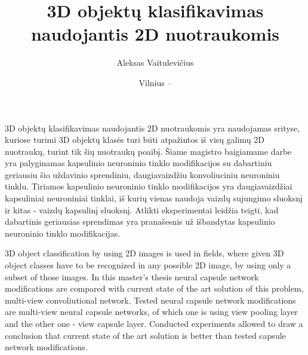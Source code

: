 \documentclass{VUMIFInfMagistrinis}
\title{3D objektų klasifikavimas naudojantis 2D nuotraukomis}
\author{Aleksas Vaitulevičius}
\date{Vilnius – \the\year}
\begin{document}
\maketitle

3D objektų klasifikavimas naudojantis 2D nuotraukomis yra naudojamas srityse, kuriose turimi 3D objektų klasės turi būti atpažintos iš visų galimų 2D nuotraukų, turint tik šių nuotraukų poaibį. Šiame magistro baigiamame darbe yra palyginamas kapsulinio neuroninio tinklo modifikacijos su dabartiniu geriausiu šio uždavinio sprendiniu, daugiavaizdžiu konvoliuciniu neuroniniu tinklu. Tiriamos kapsulinio neuroninio tinklo modifikacijos yra daugiavaizdžiai kapsuliniai neuroniniai tinklai, iš kurių vienas naudoja vaizdų sujungimo sluoksnį ir kitas - vaizdų kapsulinį sluoksnį. Atlikti eksperimentai leidžia teigti, kad dabartinis geriausias sprendimas yra pranašesnis už išbandytas kapsulinio neuroninio tinklo modifikacijas.


3D object classification by using 2D images is used in fields, where given 3D object classes have to be recognized in any possible 2D image, by using only a subset of those images. In this master's thesis neural capsule network modifications are compared with current state of the art solution of this problem, multi-view convoliutional network. Tested neural capsule network modifications are multi-view neural capsule networks, of which one is using view pooling layer and the other one - view capsule layer. Conducted experiments allowed to draw a conclusion that current state of the art solution is better than tested capsule network modifications.


\tableofcontents




\end{document}
